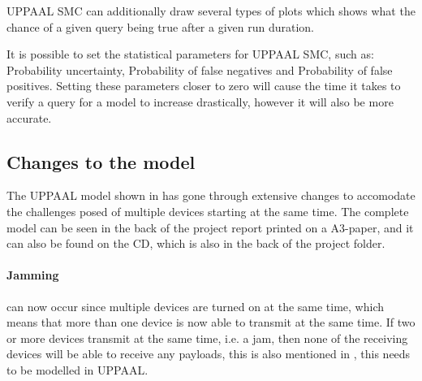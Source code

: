 UPPAAL SMC can additionally draw several types of plots which shows what the chance of a given query being true after a given run duration.

It is possible to set the statistical parameters for UPPAAL SMC, such as: Probability uncertainty, Probability of false negatives and Probability of false positives. 
Setting these parameters closer to zero will cause the time it takes to verify a query for a model to increase drastically, however it will also be more accurate. 


\subsection*{Changes to the model}


The UPPAAL model shown in  has gone through extensive changes to accomodate the challenges posed of multiple devices starting at the same time.
The complete model can be seen in the back of the project report printed on a A3-paper, and it can also be found on the CD, which is also in the back of the project folder.

\paragraph{Jamming} can now occur since multiple devices are turned on at the same time, which means that more than one device is now able to transmit at the same time.
If two or more devices transmit at the same time, i.e. a jam, then none of the receiving devices will be able to receive any payloads, this is also mentioned in , this needs to be modelled in UPPAAL. 

